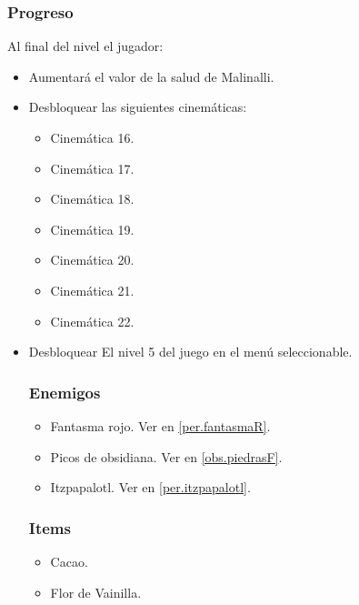 \documentclass[11pt,letterpaper]{article}
\begin{document}
        \subsubsection{Progreso}
Al final del nivel el jugador:
\begin{itemize}
        \item Aumentará el valor de la salud de Malinalli.
        \item Desbloquear las siguientes cinemáticas:
		\begin{itemize}
			\item Cinemática 16.
			\item Cinemática 17.
			\item Cinemática 18.
			\item Cinemática 19.
			\item Cinemática 20.
			\item Cinemática 21.
			\item Cinemática 22.
		\end{itemize}
        \item Desbloquear El nivel 5 del juego en el menú seleccionable.
        \subsubsection{Enemigos}
                \begin{itemize}
                        \item Fantasma rojo. Ver en \ref{per.fantasmaR}. 
                        \item Picos de obsidiana. Ver en \ref{obs.piedrasF}.
                        \item Itzpapalotl. Ver en \ref{per.itzpapalotl}.
                \end{itemize}
        \subsubsection{Items}
                \begin{itemize}
                        \item   Cacao.
                        \item Flor de Vainilla.
                \end{itemize}

\end{itemize}
\end{document}
